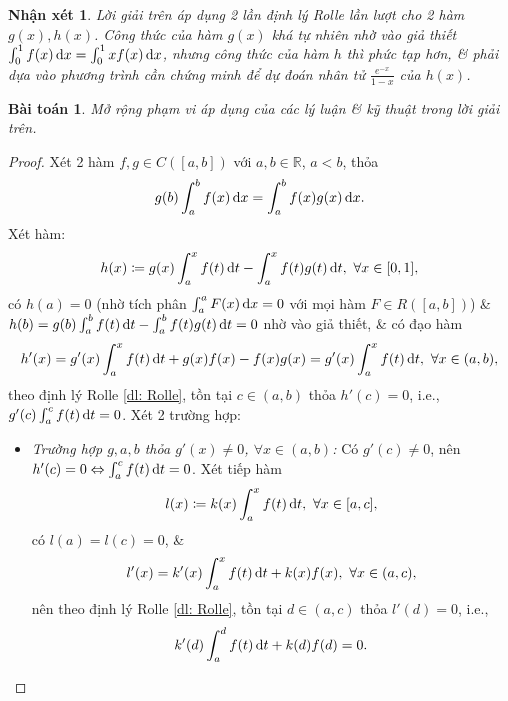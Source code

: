 \documentclass{article}
\newtheorem{baitoan}{Bài toán}
\newtheorem{nhanxet}{Nhận xét}
\begin{document}
\begin{nhanxet}
	Lời giải trên áp dụng 2 lần định lý Rolle lần lượt cho 2 hàm $g(x),h(x)$. Công thức của hàm $g(x)$ khá tự nhiên nhờ vào giả thiết $\int_0^1 f(x)\,{\rm d}x = \int_0^1 xf(x)\,{\rm d}x$, nhưng công thức của hàm $h$ thì phức tạp hơn, \& phải dựa vào phương trình cần chứng minh để dự đoán nhân tử $\frac{e^{-x}}{1 - x}$ của $h(x)$.
\end{nhanxet}

\begin{baitoan}
	Mở rộng phạm vi áp dụng của các lý luận \& kỹ thuật trong lời giải trên.
\end{baitoan}

\begin{proof}
	Xét 2 hàm $f,g\in C([a,b])$ với $a,b\in\mathbb{R}$, $a < b$, thỏa
	\begin{equation*}
		g(b)\int_a^b f(x)\,{\rm d}x = \int_a^b f(x)g(x)\,{\rm d}x.
	\end{equation*}
	Xét hàm:
	\begin{align*}
		h(x)\coloneqq g(x)\int_a^x f(t)\,{\rm d}t - \int_a^x f(t)g(t)\,{\rm d}t,\ \forall x\in[0,1],
	\end{align*}
	có $h(a) = 0$ (nhờ tích phân $\int_a^a F(x)\,{\rm d}x = 0$ với mọi hàm $F\in R([a,b])$) \& $h(b) = g(b)\int_a^b f(t)\,{\rm d}t - \int_a^b f(t)g(t)\,{\rm d}t = 0$ nhờ vào giả thiết, \& có đạo hàm
	\begin{equation*}
		h'(x) = g'(x)\int_a^x f(t)\,{\rm d}t + g(x)f(x) - f(x)g(x) = g'(x)\int_a^x f(t)\,{\rm d}t,\ \forall x\in(a,b),
	\end{equation*}
	theo định lý Rolle \ref{dl: Rolle}, tồn tại $c\in(a,b)$ thỏa $h'(c) = 0$, i.e., $g'(c)\int_a^c f(t)\,{\rm d}t = 0$. Xét 2 trường hợp:
	\begin{itemize}
		\item {\it Trường hợp $g,a,b$ thỏa $g'(x)\ne0$, $\forall x\in(a,b)$:} Có $g'(c)\ne0$, nên $h'(c) = 0\Leftrightarrow\int_a^c f(t)\,{\rm d}t = 0$. Xét tiếp hàm
		\begin{equation*}
			l(x)\coloneqq k(x)\int_a^x f(t)\,{\rm d}t,\ \forall x\in[a,c],
		\end{equation*}
		có $l(a) = l(c) = 0$, \&
		\begin{equation*}
			l'(x) = k'(x)\int_a^x f(t)\,{\rm d}t + k(x)f(x),\ \forall x\in(a,c),
		\end{equation*}
		nên theo định lý Rolle \ref{dl: Rolle}, tồn tại $d\in(a,c)$ thỏa $l'(d) = 0$, i.e.,
		\begin{equation*}
			k'(d)\int_a^d f(t)\,{\rm d}t + k(d)f(d) = 0.

\end{equation*}
\end{itemize}
\end{proof}
\end{document}
